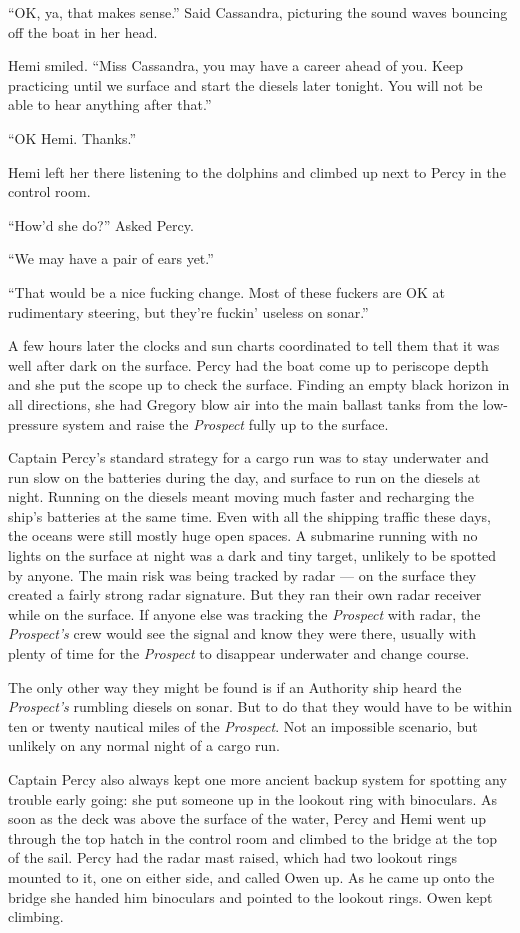\documentclass[
]{scrbook}
\begin{document}
``OK, ya, that makes sense.'' Said Cassandra, picturing the sound waves
bouncing off the boat in her head.

Hemi smiled. ``Miss Cassandra, you may have a career ahead of you. Keep
practicing until we surface and start the diesels later tonight. You
will not be able to hear anything after that.''

``OK Hemi. Thanks.''

Hemi left her there listening to the dolphins and climbed up next to
Percy in the control room.

``How'd she do?'' Asked Percy.

``We may have a pair of ears yet.''

``That would be a nice fucking change. Most of these fuckers are OK at
rudimentary steering, but they're fuckin' useless on sonar.''

A few hours later the clocks and sun charts coordinated to tell them
that it was well after dark on the surface. Percy had the boat come up
to periscope depth and she put the scope up to check the surface.
Finding an empty black horizon in all directions, she had Gregory blow
air into the main ballast tanks from the low-pressure system and raise
the \emph{Prospect} fully up to the surface.

Captain Percy's standard strategy for a cargo run was to stay underwater
and run slow on the batteries during the day, and surface to run on the
diesels at night. Running on the diesels meant moving much faster and
recharging the ship's batteries at the same time. Even with all the
shipping traffic these days, the oceans were still mostly huge open
spaces. A submarine running with no lights on the surface at night was a
dark and tiny target, unlikely to be spotted by anyone. The main risk
was being tracked by radar --- on the surface they created a fairly
strong radar signature. But they ran their own radar receiver while on
the surface. If anyone else was tracking the \emph{Prospect} with radar,
the \emph{Prospect's} crew would see the signal and know they were
there, usually with plenty of time for the \emph{Prospect} to disappear
underwater and change course.

The only other way they might be found is if an Authority ship heard the
\emph{Prospect's} rumbling diesels on sonar. But to do that they would
have to be within ten or twenty nautical miles of the \emph{Prospect}.
Not an impossible scenario, but unlikely on any normal night of a cargo
run.

Captain Percy also always kept one more ancient backup system for
spotting any trouble early going: she put someone up in the lookout ring
with binoculars. As soon as the deck was above the surface of the water,
Percy and Hemi went up through the top hatch in the control room and
climbed to the bridge at the top of the sail. Percy had the radar mast
raised, which had two lookout rings mounted to it, one on either side,
and called Owen up. As he came up onto the bridge she handed him
binoculars and pointed to the lookout rings. Owen kept climbing.
\end{document}
